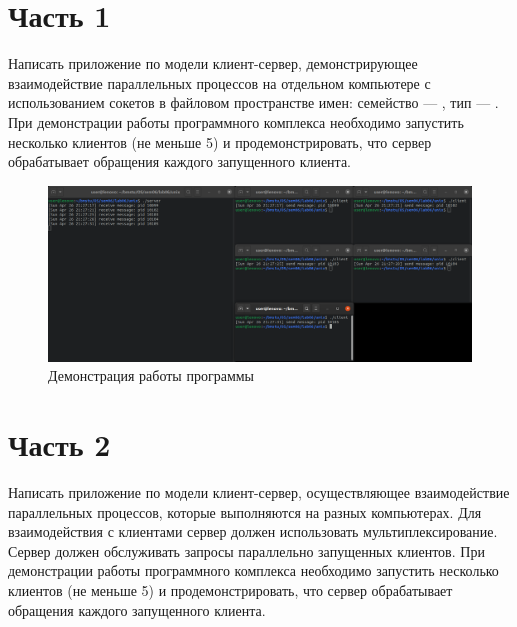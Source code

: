 \documentclass[a4paper,oneside,12pt]{extreport}
\begin{document}


\section*{Часть 1}

\begin{task*}
	Написать приложение по модели клиент-сервер, демонстрирующее взаимодействие параллельных процессов на отдельном компьютере с использованием сокетов в файловом пространстве имен: семейство — , тип — .
	При демонстрации работы программного комплекса необходимо запустить несколько клиентов (не меньше 5) и продемонстрировать, что сервер обрабатывает обращения каждого запущенного клиента.
\end{task*}





\begin{figure}[H]
	\centering
	\includegraphics[width=\linewidth]{inc/img/unix-runtime}
	\caption{Демонстрация работы программы}
	\label{img:unix-runtime}
\end{figure}

\section*{Часть 2}

\begin{task*}
	Написать приложение по модели клиент-сервер, осуществляющее взаимодействие параллельных процессов, которые выполняются на разных компьютерах.
	Для взаимодействия с клиентами сервер должен использовать мультиплексирование.
	Сервер должен обслуживать запросы параллельно запущенных клиентов.
	При демонстрации работы программного комплекса необходимо запустить несколько клиентов (не меньше 5) и продемонстрировать, что сервер обрабатывает обращения каждого запущенного клиента.
\end{task*}
\end{document}
